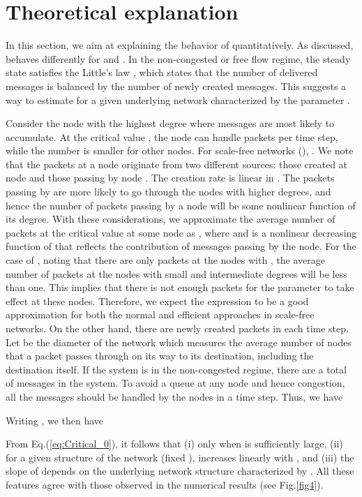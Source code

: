 \documentclass[aps,prl,twocolumn,superscriptaddress,showpacs]{revtex4}
\begin{document}
\section{Theoretical explanation}

In this section, we aim at explaining the behavior of
 quantitatively.  As discussed,  behaves differently for  and
.  In the non-congested or free flow regime,
the steady state satisfies the Little's law \cite{Allen:1990},
which states that the number of delivered messages is balanced by
the number of newly created messages.  This suggests a way to
estimate  for a given underlying network
characterized by the parameter .

Consider the node with the highest degree  where
messages are most likely to accumulate. At the critical value
, the node can handle  packets
per time step, while the number is smaller for other nodes. For
scale-free networks (), 
\cite{AB:2002}.  We note that the packets at a node  originate
from two different sources: those created at node  and those
passing by node . The creation rate  is linear in
.  The packets passing by are more likely to go through the
nodes with higher degrees, and hence the number of packets passing
by a node will be some nonlinear function of its degree. With
these considerations, we approximate the average number of packets
at the critical value  at some node  as
, where  and  is a nonlinear
decreasing function of  that reflects the contribution of
messages passing by the node.  For the case of , noting that
there are only  packets at the nodes with
, the average number of packets at the nodes with small
and intermediate degrees will be less than one.  This implies that
there is not enough packets for the parameter  to take
effect at these nodes.  Therefore, we expect the expression
 to be a good
approximation for both the normal and efficient approaches in
scale-free networks.  On the other hand, there are 
newly created packets in each time step.  Let  be the
diameter of the network which measures the average number of nodes
that a packet passes through on its way to its destination,
including the destination itself.  If the system is in the
non-congested regime, there are a total of 
messages in the system. To avoid a queue at any node and hence
congestion, all the messages should be handled by the nodes in a
time step.  Thus, we have

Writing
, we
then have

From Eq.(\ref{eq:Critical_0}), it follows that (i) 
only when  is sufficiently large, (ii) for a given
structure of the network (fixed ),  increases
linearly with , and (iii) the slope of
 depends on the underlying network structure
characterized by .  All these features agree with those
observed in the numerical results (see Fig.\ref{fig4}).
\end{document}
